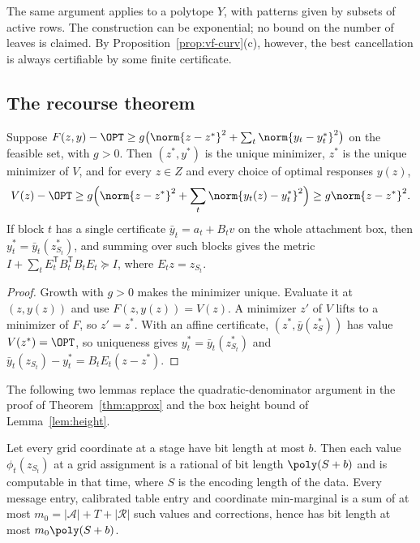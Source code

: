 The same argument applies to a polytope $Y$, with patterns given by subsets
of active rows. The construction can be exponential; no bound on the number
of leaves is claimed. By Proposition~\ref{prop:vf-curv}(c), however, the
best cancellation is always certifiable by some finite certificate.

\subsection{The recourse theorem}

\begin{lemma}\label{lem:cr-growth}
Suppose $F(z,y)-\OPT\ge g\bigl(\norm{z-z^*}^2+\sum_t\norm{y_t-y_t^*}^2\bigr)$ on
the feasible set, with $g>0$. Then $(z^*,y^*)$ is the unique minimizer, $z^*$
is the unique minimizer of $V$, and for every $z\in Z$ and every choice of
optimal responses $y(z)$,
\[
V(z)-\OPT\ge g\Bigl(\norm{z-z^*}^2+\sum_t\norm{y_t(z)-y_t^*}^2\Bigr)
\ge g\norm{z-z^*}^2.
\]
If block $t$ has a single certificate $\bar y_t=a_t+B_tv$ on the whole
attachment box, then $y_t^*=\bar y_t(z^*_{S_t})$, and summing over such blocks
gives the metric $I+\sum_tE_t^{\mathsf T}B_t^{\mathsf T}B_tE_t\succeq I$, where
$E_tz=z_{S_t}$.
\end{lemma}

\begin{proof}
Growth with $g>0$ makes the minimizer unique. Evaluate it at $(z,y(z))$ and use
$F(z,y(z))=V(z)$. A minimizer $z'$ of $V$ lifts to a minimizer of $F$, so
$z'=z^*$. With an affine certificate, $(z^*,\bar y(z^*_{S}))$ has value
$V(z^*)=\OPT$, so uniqueness gives $y_t^*=\bar y_t(z^*_{S_t})$ and
$\bar y_t(z_{S_t})-y_t^*=B_tE_t(z-z^*)$.
\end{proof}

The following two lemmas replace the quadratic-denominator argument in the
proof of Theorem~\ref{thm:approx} and the box height bound of
Lemma~\ref{lem:height}.

\begin{lemma}\label{lem:cr-bits}
Let every grid coordinate at a stage have bit length at most $b$. Then each
value $\phi_t(z_{S_t})$ at a grid assignment is a rational of bit length
$\poly(S+b)$ and is computable in that time, where $S$ is the encoding length
of the data. Every message entry, calibrated table entry and coordinate
min-marginal is a sum of at most $m_0=|\mathcal A|+T+|\mathcal R|$ such values
and corrections, hence has bit length at most $m_0\poly(S+b)$.
\end{lemma}


